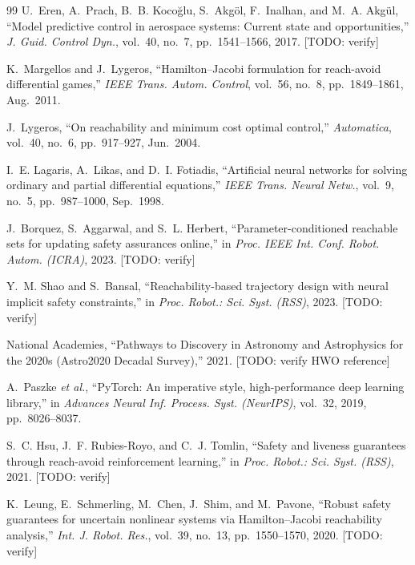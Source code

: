 \documentclass[letterpaper, 10 pt, conference]{ieeeconf}
\begin{document}
\begin{thebibliography}{99}
U.~Eren, A.~Prach, B.~B. Koco\u{g}lu, S.~Akg\"{o}l, F.~Inalhan, and M.~A. Akg\"{u}l, ``Model predictive control in aerospace systems: Current state and opportunities,'' \emph{J. Guid. Control Dyn.}, vol.~40, no.~7, pp.~1541--1566, 2017. [TODO: verify]

K.~Margellos and J.~Lygeros, ``Hamilton--Jacobi formulation for reach-avoid differential games,'' \emph{IEEE Trans. Autom. Control}, vol.~56, no.~8, pp.~1849--1861, Aug.~2011.

J.~Lygeros, ``On reachability and minimum cost optimal control,'' \emph{Automatica}, vol.~40, no.~6, pp.~917--927, Jun.~2004.

I.~E. Lagaris, A.~Likas, and D.~I. Fotiadis, ``Artificial neural networks for solving ordinary and partial differential equations,'' \emph{IEEE Trans. Neural Netw.}, vol.~9, no.~5, pp.~987--1000, Sep.~1998.

J.~Borquez, S.~Aggarwal, and S.~L. Herbert, ``Parameter-conditioned reachable sets for updating safety assurances online,'' in \emph{Proc. IEEE Int. Conf. Robot. Autom. (ICRA)}, 2023. [TODO: verify]

Y.~M. Shao and S.~Bansal, ``Reachability-based trajectory design with neural implicit safety constraints,'' in \emph{Proc. Robot.: Sci. Syst. (RSS)}, 2023. [TODO: verify]

National Academies, ``Pathways to Discovery in Astronomy and Astrophysics for the 2020s (Astro2020 Decadal Survey),'' 2021. [TODO: verify HWO reference]

A.~Paszke \emph{et al.}, ``PyTorch: An imperative style, high-performance deep learning library,'' in \emph{Advances Neural Inf. Process. Syst. (NeurIPS)}, vol.~32, 2019, pp.~8026--8037.

S.~C. Hsu, J.~F. Rubies-Royo, and C.~J. Tomlin, ``Safety and liveness guarantees through reach-avoid reinforcement learning,'' in \emph{Proc. Robot.: Sci. Syst. (RSS)}, 2021. [TODO: verify]

K.~Leung, E.~Schmerling, M.~Chen, J.~Shim, and M.~Pavone, ``Robust safety guarantees for uncertain nonlinear systems via Hamilton--Jacobi reachability analysis,'' \emph{Int. J. Robot. Res.}, vol.~39, no.~13, pp.~1550--1570, 2020. [TODO: verify]

\end{thebibliography}
\end{document}
